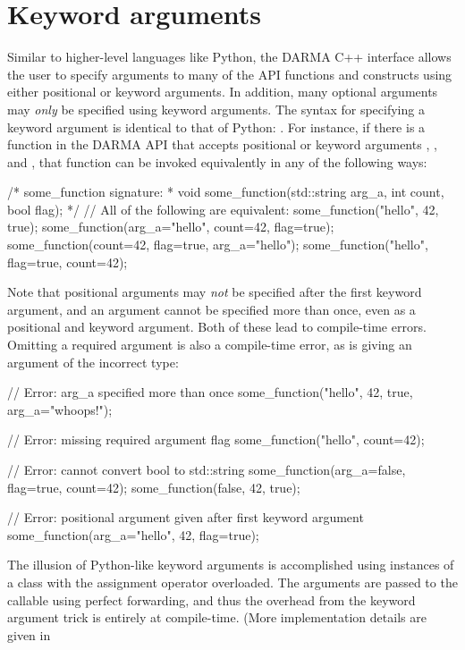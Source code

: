 \section{Keyword arguments}
\label{sec:keyword}


Similar to higher-level languages like Python, the DARMA C++ interface allows the user
to specify arguments to many of the API functions and constructs using either positional
or keyword arguments.  In addition, many optional arguments may {\em only} be specified using
keyword arguments.  The syntax for specifying a keyword argument is identical to that
of Python: .  For instance, if there is a function  in the
DARMA API that accepts positional or keyword arguments , , and , that 
function can be invoked equivalently in any of the following ways:
\begin{CppCode}
/* some_function signature:
 *  void some_function(std::string arg_a, int count, bool flag);
 */
// All of the following are equivalent:
some_function("hello", 42, true);
some_function(arg_a="hello", count=42, flag=true);
some_function(count=42, flag=true, arg_a="hello");
some_function("hello", flag=true, count=42);
\end{CppCode}
Note that positional arguments may {\em not} be specified after the first keyword argument,
and an argument cannot be specified more than once, even as a positional and keyword
argument.  Both of these lead to compile-time errors. Omitting a required argument is 
also a compile-time error, as is giving an argument of the incorrect type: 
\begin{CppCode}
// Error: arg_a specified more than once
some_function("hello", 42, true, arg_a="whoops!");

// Error: missing required argument flag
some_function("hello", count=42);

// Error: cannot convert bool to std::string
some_function(arg_a=false, flag=true, count=42);
some_function(false, 42, true);

// Error: positional argument given after first keyword argument
some_function(arg_a="hello", 42, flag=true);
\end{CppCode}
The illusion of Python-like keyword arguments is accomplished using  instances
of a class with the assignment operator overloaded.  The arguments are passed to the 
callable using perfect forwarding, and thus the overhead from the keyword argument 
trick is entirely at compile-time.  (More implementation details are given in
